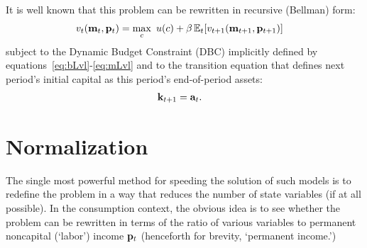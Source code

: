 \documentclass[titlepage, headings=optiontotocandhead]{Resources/texmf-local/tex/latex/econtex}
\begin{document}
It is well known that this problem can be rewritten in recursive (Bellman) form:
  \begin{equation}\begin{gathered}\begin{aligned}
        v_{t}(\mathbf{m}_{t},\mathbf{p}_{t})  & = \max_{c}~ u(c) + \beta \operatorname{\mathbb{E}}_{t}[ v_{t+1}(\mathbf{m}_{t+1},\mathbf{p}_{t+1})]\label{eq:vrecurse}
      \end{aligned}\end{gathered}\end{equation}
subject to the Dynamic Budget Constraint (DBC) implicitly defined by equations~\eqref{eq:bLvl}-\eqref{eq:mLvl} and to the transition equation that defines next period's initial capital as this period's end-of-period assets:
\begin{equation}\begin{gathered}\begin{aligned}
      \mathbf{k}_{t+1} & = \mathbf{a}_{t}. \label{eq:transitionstate}
    \end{aligned}\end{gathered}\end{equation}



\hypertarget{normalization}{}
\section{Normalization}\label{sec:normalization}

The single most powerful method for speeding the solution of such models is to redefine the problem in a way that reduces the number of state variables (if at all possible).  In the consumption context, the obvious idea is to see whether the problem can be rewritten in terms of the ratio of various variables to permanent noncapital (`labor') income $\mathbf{p}_{t}$ (henceforth for brevity, `permanent income.')
\end{document}
